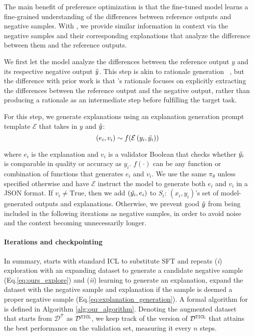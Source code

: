The main benefit of preference optimization is that the fine-tuned model learns a fine-grained understanding of the differences between reference outputs and negative samples. 
With \ours, we provide similar information in context via the negative samples and their corresponding explanations that analyze the difference between them and the reference outputs. 

We first let the model analyze the differences between the reference output $y$ and its respective negative output $\Tilde{y}$. 
This step is akin to rationale generation~
\cite{wang2022rationale, wei2022chain, zhou-etal-2022-reflect}, but the difference with prior work is that \ours's rationale focuses on explicitly extracting the differences between the reference output and the negative output, rather than producing a rationale as an intermediate step before fulfilling the target task. 

For this step, we generate explanations using an explanation generation prompt template $\mathcal{E}$ that takes in $y$ and $\Tilde{y}$:  
\begin{equation}
    (e_i,v_i)\sim f(\mathcal{E}\left(y_i, \Tilde{y_i})\right)
    \label{eq:explanation_generation}
\end{equation}



where $e_i$ is the explanation and $v_i$ is a validator Boolean that checks whether $\Tilde{y_i}$ is comparable in quality or accuracy as $y_i$. 
$f(\cdot)$ can be any function or combination of functions that generates $e_i$ and $v_i$. 
We use the same $\pi_\theta$ unless specified otherwise and have $\mathcal{E}$ instruct the model to generate both $e_i$ and $v_i$ in a JSON format. 
If $v_i\neq\text{True}$, then we add $(\Tilde{y_i},e_i)$ to $S_i$:  $(x_i,y_i)$'s set of model-generated outputs and explanations. 
Otherwise, we prevent good $\Tilde{y}$ from being included in the following iterations as negative samples, in order to avoid noise and the context becoming unnecessarily longer. 



\paragraph{Iterations and checkpointing}

In summary, \ours starts with standard ICL to substitute SFT and  repeats (\textit{i}) exploration with an expanding dataset to  generate a candidate negative sample (Eq.\ref{eq:ours_explore}) and (\textit{ii}) learning to generate an explanation, expand the dataset with the negative sample and explanation if the sample is deemed a proper negative sample (Eq.\ref{eq:explanation_generation}).
A formal algorithm for \ours is defined in Algorithm \ref{alg:our_algorithm}. 
Denoting the augmented dataset that starts from $\mathcal{D}^{\mathcal{T}}$ as $\mathcal{D}^\texttt{\textsc{TICL}}$, 
we keep track of the version of $\mathcal{D}^\texttt{\textsc{TICL}}$ that attains the best performance on the validation set, measuring it every $n$ steps. 









